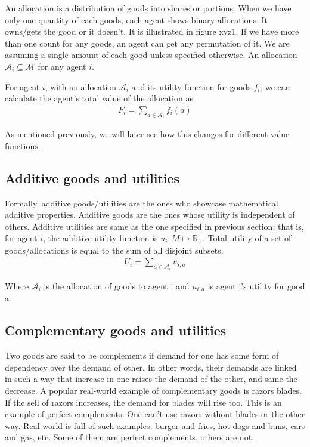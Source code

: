 An allocation is a distribution of goods into shares or portions. When we have only one quantity of each goods, each agent shows binary allocations. It owns/gets the good or it doesn't. It is illustrated in figure xyz1. If we have more than one count for any goods, an agent can get any permutation of it. We are assuming a single amount of each good unless specified otherwise. An allocation $\mathcal{A}_i\subseteq \mathcal{M}$ for any agent $i$.

For agent $i$, with an allocation $\mathcal{A}_i$ and its utility function for goods $f_i$, we can calculate the agent's total value of the allocation as
\begin{gather}
    F_i = \sum_{a \in \mathcal{A}_i} f_i(a)
\end{gather}

As mentioned previously, we will later see how this changes for different value functions.

\subsection{Additive goods and utilities}
Formally, additive goods/utilities are the ones who showcase mathematical additive properties. Additive goods are the ones whose utility is independent of others. Additive utilities are same as the one specified in previous section; that is, for agent $i$, the additive utility function is $u_i: M\mapsto \mathbb{R_+}$. Total utility of a set of goods/allocations is equal to the sum of all disjoint subsets.
\begin{gather}
    U_i = \sum_{a \in \mathcal{A}_i} u_{i,a}
\end{gather}

Where $\mathcal{A}_i$ is the allocation of goods to agent i and $u_{i,a}$ is agent i's utility for good a.

\subsection{Complementary goods and utilities}
Two goods are said to be complements if demand for one has some form of dependency over the demand of other. In other words, their demands are linked in such a way that increase in one raises the demand of the other, and same the decrease. A popular real-world example of complementary goods is razors blades. If the sell of razors increases, the demand for blades will rise too. This is an example of perfect complements. One can't use razors without blades or the other way. Real-world is full of such examples; burger and fries, hot dogs and buns, cars and gas, etc. Some of them are perfect complements, others are not.

